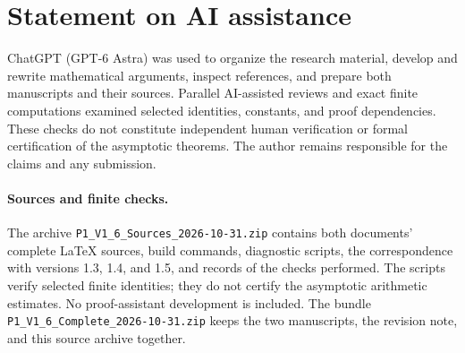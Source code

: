 \section*{Statement on AI assistance}

ChatGPT (GPT-6 Astra) was used to organize the research material,
develop and rewrite mathematical arguments, inspect references,
and prepare both manuscripts and their sources.
Parallel AI-assisted reviews and exact finite computations examined
selected identities, constants, and proof dependencies.
These checks do not constitute independent human verification or
formal certification of the asymptotic theorems. The author remains
responsible for the claims and any submission.

\ifdefined\PoneTechnicalCompanion\else
\paragraph{Sources and finite checks.}
The archive \nolinkurl{P1_V1_6_Sources_2026-10-31.zip} contains
both documents' complete LaTeX sources, build commands, diagnostic
scripts, the correspondence with versions 1.3, 1.4, and 1.5, and records of the
checks performed. The scripts verify selected finite identities;
they do not certify the asymptotic arithmetic estimates.
No proof-assistant development is included.
The bundle \nolinkurl{P1_V1_6_Complete_2026-10-31.zip} keeps
the two manuscripts, the revision note, and this source archive together.
\fi
